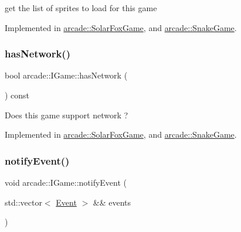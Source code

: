 get the list of sprites to load for this game 



Implemented in \hyperlink{classarcade_1_1_solar_fox_game_afa9d714001212c869f616bd265dd9371}{arcade\+::\+Solar\+Fox\+Game}, and \hyperlink{classarcade_1_1_snake_game_aac167f01d2da5121b2f34dd3ca258a45}{arcade\+::\+Snake\+Game}.

\mbox{\label{classarcade_1_1_i_game_ae66bf253e252f43ce17d9e94f08a1d1c}} 
\subsubsection{\texorpdfstring{has\+Network()}{hasNetwork()}}
{\footnotesize\ttfamily bool arcade\+::\+I\+Game\+::has\+Network (\begin{DoxyParamCaption}{ }\end{DoxyParamCaption}) const\hspace{0.3cm}{\ttfamily [pure virtual]}}



Does this game support network ? 



Implemented in \hyperlink{classarcade_1_1_solar_fox_game_a4142a002e8b141216c67638ba7a118d3}{arcade\+::\+Solar\+Fox\+Game}, and \hyperlink{classarcade_1_1_snake_game_aa93dbf6b52cb70629abbf646ed33374f}{arcade\+::\+Snake\+Game}.

\mbox{\label{classarcade_1_1_i_game_a37d164b4052fa3c28256fb0bf0002876}} 
\subsubsection{\texorpdfstring{notify\+Event()}{notifyEvent()}}
{\footnotesize\ttfamily void arcade\+::\+I\+Game\+::notify\+Event (\begin{DoxyParamCaption}\item[{std\+::vector$<$ \hyperlink{structarcade_1_1_event}{Event} $>$ \&\&}]{events }\end{DoxyParamCaption})\hspace{0.3cm}{\ttfamily [pure virtual]}}



